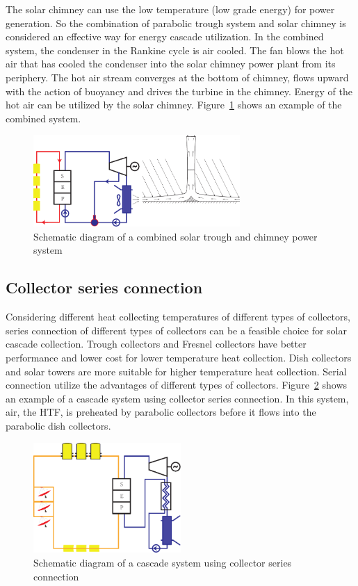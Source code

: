 The solar chimney can use the low temperature (low grade energy) for power generation. So the combination of parabolic trough system and solar chimney is considered an effective way for energy cascade utilization. In the combined system, the condenser in the Rankine cycle is air cooled. The fan blows the hot air that has cooled the condenser into the solar chimney power plant from its periphery. The hot air stream converges at the bottom of chimney, flows upward with the action of buoyancy and drives the turbine in the chimney.
Energy of the hot air can be utilized by the solar chimney. Figure~\ref{fig:CombinedSolarChimney} shows an example of the combined system. 

\begin{figure}[!ht]
\centering 
\includegraphics[width=0.7\textwidth]{fig/CombinedSolarChimney}
\caption{Schematic diagram of a combined solar trough and chimney power system}\label{fig:CombinedSolarChimney}
\end{figure}

\subsection{Collector series connection}
\label{sec:csc}

Considering different heat collecting temperatures of different types of collectors, series connection of different types of collectors can be a feasible choice for solar cascade collection. Trough collectors and Fresnel collectors have better performance and lower cost for lower temperature heat collection. Dish collectors and solar towers are more suitable for higher temperature heat collection. Serial connection utilize the advantages of different types of collectors. Figure~\ref{fig:SeriesCollector} shows an example of a cascade system using collector series connection. In this system, air, the HTF, is preheated by parabolic collectors before it flows into the parabolic dish collectors.

\begin{figure}[!ht]
\centering 
\includegraphics[width=0.5\textwidth]{fig/SeriesCollector}
\caption{Schematic diagram of a cascade system using collector series connection}\label{fig:SeriesCollector}
\end{figure}

